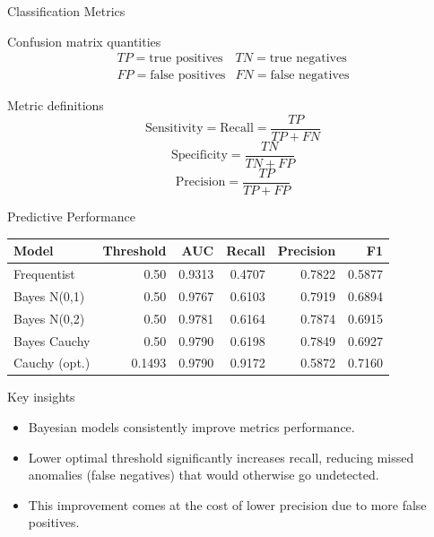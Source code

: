 \documentclass[aspectratio=169,11pt]{beamer}
\begin{document}
\begin{frame}{Classification Metrics}

\begin{block}{Confusion matrix quantities}
\[
\begin{array}{cc}
TP=\text{true positives} & TN=\text{true negatives} \\
FP=\text{false positives} & FN=\text{false negatives}
\end{array}
\]
\end{block}

\begin{block}{Metric definitions}
\[
\text{Sensitivity}=\text{Recall}=\frac{TP}{TP+FN}
\]
\[
\text{Specificity}=\frac{TN}{TN+FP}
\]
\[
\text{Precision}=\frac{TP}{TP+FP}
\]
\end{block}

\end{frame}

\begin{frame}{Predictive Performance}

\begin{table}
\centering
\small
\begin{tabular}{lrrrrr}
\toprule
\textbf{Model} & \textbf{Threshold} & \textbf{AUC} & \textbf{Recall} & \textbf{Precision} & \textbf{F1} \\
\midrule
Frequentist & 0.50 & 0.9313 & 0.4707 & 0.7822 & 0.5877 \\
Bayes N(0,1) & 0.50 & 0.9767 & 0.6103 & 0.7919 & 0.6894 \\
Bayes N(0,2) & 0.50 & 0.9781 & 0.6164 & 0.7874 & 0.6915 \\
Bayes Cauchy & 0.50 & 0.9790 & 0.6198 & 0.7849 & 0.6927 \\
Cauchy (opt.) & 0.1493 & 0.9790 & 0.9172 & 0.5872 & 0.7160 \\
\bottomrule
\end{tabular}
\end{table}

\vspace{0.1cm}

\begin{block}{Key insights}

\begin{itemize}
  \item Bayesian models consistently improve metrics performance.
  \item Lower optimal threshold significantly increases recall, reducing missed anomalies (false negatives) that would otherwise go undetected.
  \item This improvement comes at the cost of lower precision due to more false positives.
\end{itemize}

\end{block}
\end{frame}
\end{document}

